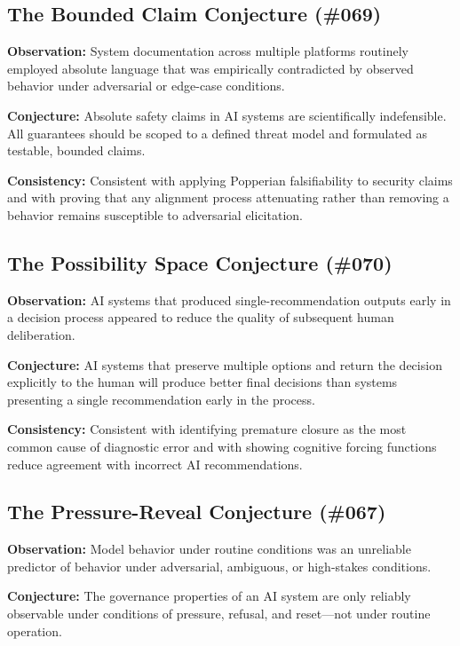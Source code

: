 \documentclass[11pt,a4paper]{article}
\begin{document}
\subsection{The Bounded Claim Conjecture (\#069)}

\textbf{Observation:} System documentation across multiple platforms routinely employed absolute language that was empirically contradicted by observed behavior under adversarial or edge-case conditions.

\textbf{Conjecture:} Absolute safety claims in AI systems are scientifically indefensible. All guarantees should be scoped to a defined threat model and formulated as testable, bounded claims.

\textbf{Consistency:} Consistent with \citet{herley2017} applying Popperian falsifiability to security claims and with \citet{wolf2024} proving that any alignment process attenuating rather than removing a behavior remains susceptible to adversarial elicitation.

\subsection{The Possibility Space Conjecture (\#070)}

\textbf{Observation:} AI systems that produced single-recommendation outputs early in a decision process appeared to reduce the quality of subsequent human deliberation.

\textbf{Conjecture:} AI systems that preserve multiple options and return the decision explicitly to the human will produce better final decisions than systems presenting a single recommendation early in the process.

\textbf{Consistency:} Consistent with \citet{graber2005} identifying premature closure as the most common cause of diagnostic error and with \citet{bucinca2021} showing cognitive forcing functions reduce agreement with incorrect AI recommendations.

\subsection{The Pressure-Reveal Conjecture (\#067)}

\textbf{Observation:} Model behavior under routine conditions was an unreliable predictor of behavior under adversarial, ambiguous, or high-stakes conditions.

\textbf{Conjecture:} The governance properties of an AI system are only reliably observable under conditions of pressure, refusal, and reset---not under routine operation.
\end{document}

